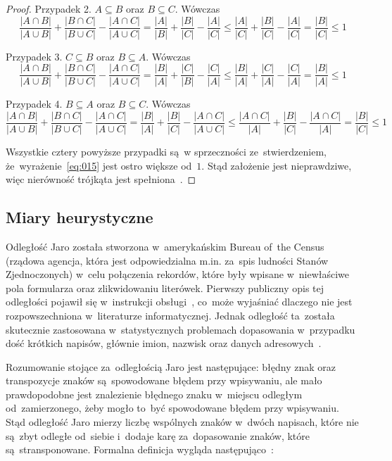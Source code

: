 \documentclass{praca1}
\begin{document}
\begin{proof}
Przypadek 2. $A\subseteq B$ oraz $B \subseteq C$. Wówczas
$$
\frac{|A\cap B|}{|A\cup B|} + \frac{|B\cap C|}{|B\cup C|} - \frac{|A\cap C|}{|A\cup C|} = 
\frac{|A|}{|B|} + \frac{|B|}{|C|} - \frac{|A|}{|C|} \leq 
\frac{|A|}{|C|} + \frac{|B|}{|C|} - \frac{|A|}{|C|} = 
\frac{|B|}{|C|} \leq 1
$$

Przypadek 3. $C\subseteq B$ oraz $B \subseteq A$. Wówczas
$$
\frac{|A\cap B|}{|A\cup B|} + \frac{|B\cap C|}{|B\cup C|} - \frac{|A\cap C|}{|A\cup C|} = 
\frac{|B|}{|A|} + \frac{|C|}{|B|} - \frac{|C|}{|A|} \leq 
\frac{|B|}{|A|} + \frac{|C|}{|A|} - \frac{|C|}{|A|} =
\frac{|B|}{|A|} \leq 1
$$

Przypadek 4. $B\subseteq A$ oraz $B \subseteq C$. Wówczas
$$
\frac{|A\cap B|}{|A\cup B|} + \frac{|B\cap C|}{|B\cup C|} - \frac{|A\cap C|}{|A\cup C|} = 
\frac{|B|}{|A|} + \frac{|B|}{|C|} - \frac{|A\cap C|}{|A\cup C|} \leq 
\frac{|A \cap C|}{|A|} + \frac{|B|}{|C|} - \frac{|A\cap C|}{|A|} =
\frac{|B|}{|C|} \leq 1
$$

Wszystkie cztery powyższe przypadki są~w sprzeczności ze~stwierdzeniem, że~wyrażenie~\eqref{eq:015} jest ostro większe od~$1$. Stąd założenie jest nieprawdziwe, więc nierówność trójkąta jest spełniona~\cite{Wilbik2012:distance}.
\end{proof}

\subsection{Miary heurystyczne}


Odległość Jaro została stworzona w~amerykańskim Bureau of~the Census (rządowa agencja, która jest odpowiedzialna m.in. za~spis ludności Stanów Zjednoczonych) w~celu połączenia rekordów, które były wpisane w~niewłaściwe pola formularza oraz zlikwidowaniu literówek. Pierwszy publiczny opis tej odległości pojawił się w~instrukcji obsługi~\cite{Jaro1978:usermanual}, co~może wyjaśniać dlaczego nie jest rozpowszechniona w~literaturze informatycznej. Jednak odległość ta~została skutecznie zastosowana w~statystycznych problemach dopasowania w~przypadku dość krótkich napisów, głównie imion, nazwisk oraz danych adresowych~\cite{Loo2014:stringdist}.

Rozumowanie stojące za~odległością Jaro jest następujące: błędny znak oraz transpozycje znaków są~spowodowane błędem przy wpisywaniu, ale mało prawdopodobne jest znalezienie błędnego znaku w~miejscu odległym od~zamierzonego, żeby mogło to~być spowodowane błędem przy wpisywaniu. Stąd odległość Jaro mierzy liczbę wspólnych znaków w~dwóch napisach, które nie są~zbyt odległe od~siebie i~dodaje karę za~dopasowanie znaków, które są~stransponowane. Formalna definicja wygląda następująco~\cite{Loo2014:stringdist}:
\end{document}
